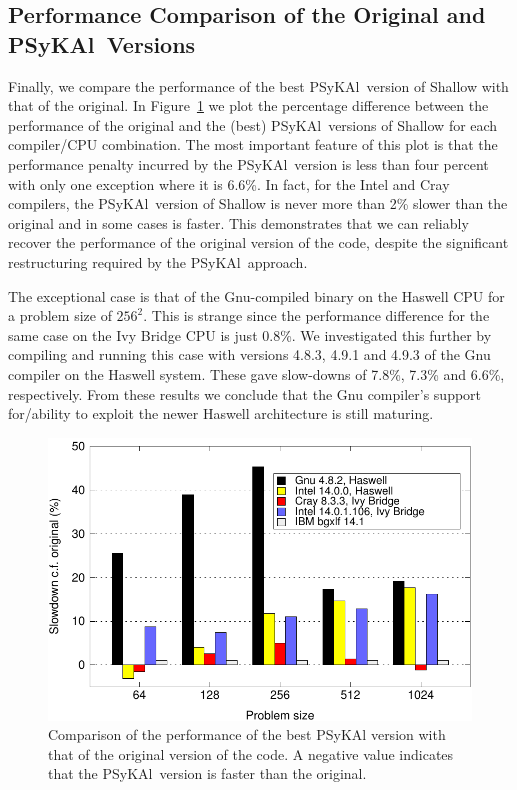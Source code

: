 \documentclass{IOS-Book-Article}
\newcommand{\psykal}{{PS}y{KA}l}
\begin{document}
\subsection{Performance Comparison of the Original and \psykal\ Versions}

Finally, we compare the performance of the best \psykal\ version of
Shallow with that of the original. In
Figure~\ref{FIG_slowdown_summary} we plot the percentage
  difference between the performance of the original and the (best)
\psykal\ versions of Shallow for each compiler/CPU combination. The
most important feature of this plot is that the performance penalty
incurred by the \psykal\ version is less than four percent with only
one exception where it is 6.6\%.  In fact, for the Intel and Cray
compilers, the \psykal\ version of Shallow is never more than 2\%
slower than the original and in some cases is faster.  This
demonstrates that we can reliably recover the performance of the
original version of the code, despite the significant restructuring
required by the \psykal\ approach.

The exceptional case is that of the Gnu-compiled binary on the Haswell
CPU for a problem size of $256^2$.  This is strange since the
performance difference for the same case on the Ivy Bridge CPU is just
0.8\%. We investigated this further by compiling and running this case
with versions 4.8.3, 4.9.1 and 4.9.3 of the Gnu compiler on the
Haswell system. These gave slow-downs of 7.8\%, 7.3\% and 6.6\%,
respectively. From these results we conclude that the Gnu compiler's
support for/ability to exploit the newer Haswell architecture is still
maturing.

\begin{figure}[!t]
\centering
\includegraphics[width=120mm]{slowdown_summary}
\caption{Comparison of the performance of the best \psykal
version with that of the original version of the code. A negative value 
indicates that the \psykal\ version is faster than the original.}
\label{FIG_slowdown_summary}
\end{figure}
\end{document}

